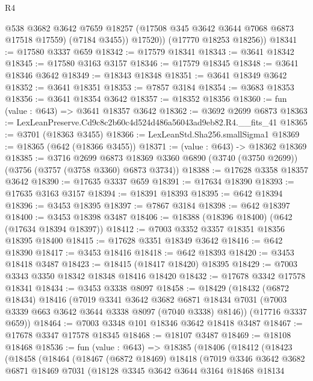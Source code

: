 \begin{lexlean}{R4}
\begin{coremodule}
            @538
            @3682
            @3642
            @7659
            @18257
            (@17508 @345 @3642 @3644 @7068 @6873 @17518 @17559)
            (@7184 @3455))
          @17520))
      (@17770 @18253 @18256))
@18341 := @17580 @3337 @659
@18342 := @17579 @18341
@18343 := @3641 @18342
@18345 := @17580 @3163 @3157
@18346 := @17579 @18345
@18348 := @3641 @18346 @3642
@18349 := @18343 @18348
@18351 := @3641 @18349 @3642
@18352 := @3641 @18351
@18353 := @7857 @3184
@18354 := @3683 @18353
@18356 := @3641 @18354 @3642
@18357 := @18352 @18356
@18360 := fun (value : @643) => @3641 @18357 @3642
@18362 := @3692 @2699 @6873
@18363 := LexLeanPreserve.Cd9c8c2b60c4d524d486a56043ad9eb82.R4.__fits_41
@18365 := @3701 (@18363 @3455)
@18366 := LexLeanStd.Sha256.smallSigma1
@18369 := @18365 (@642 (@18366 @3455))
@18371 := (value : @643) -> @18362 @18369
@18385 := @3716
    @2699
    @6873
    @18369
    @3360
    @6890
    (@3740 (@3750 @2699))
    (@3756 (@3757 (@3758 @3360) @6873 @3734))
@18388 := @17628 @3358 @18357 @3642
@18390 := @17635 @3337 @659
@18391 := @17634 @18390
@18393 := @17635 @3163 @3157
@18394 := @18391 @18393
@18395 := @642 @18394
@18396 := @3453 @18395
@18397 := @7867 @3184
@18398 := @642 @18397
@18400 := @3453 @18398 @3487
@18406 := @18388 (@18396 @18400) (@642 (@17634 @18394 @18397))
@18412 := @7003 @3352 @3357 @18351 @18356 @18395 @18400
@18415 := @17628 @3351 @18349 @3642
@18416 := @642 @18390
@18417 := @3453 @18416
@18418 := @642 @18393
@18420 := @3453 @18418 @3487
@18423 := @18415 (@18417 @18420) @18395
@18429 := @7003 @3343 @3350 @18342 @18348 @18416 @18420
@18432 := @17678 @3342 @17578 @18341
@18434 := @3453 @3338 @8097
@18458 := @18429
    (@18432
      (@6872 @18434)
      @18416
      (@7019
        @3341
        @3642
        @3682
        @6871
        @18434
        @7031
        (@7003 @3339 @663 @3642 @3644 @3338 @8097 (@7040 @3338) @8146))
      (@17716 @3337 @659))
@18464 := @7003 @3348 @101 @18346 @3642 @18418 @3487
@18467 := @17678 @3347 @17578 @18345
@18468 := @18107 @3487
@18469 := @18108 @18468
@18536 := fun (value : @643) =>
  @18385
    (@18406
      (@18412
        (@18423
          (@18458
            (@18464
              (@18467
                (@6872 @18469)
                @18418
                (@7019
                  @3346
                  @3642
                  @3682
                  @6871
                  @18469
                  @7031
                  (@18128
                    @3345
                    @3642
                    @3644
                    @3164
                    @18468
                    @18134

\end{coremodule}
\end{lexlean}
